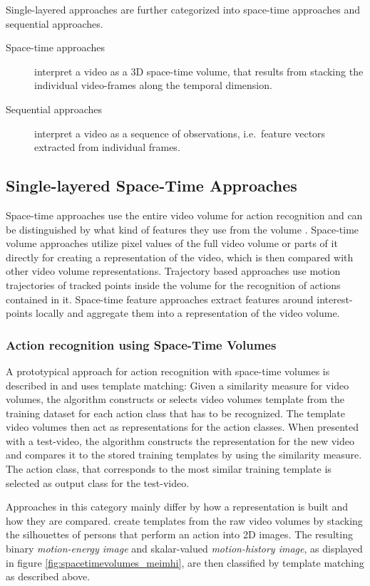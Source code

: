 Single-layered approaches are further categorized into space-time approaches and sequential approaches.
\begin{description}
    \item[Space-time approaches] interpret a video as a 3D space-time volume, that results from stacking the individual video-frames along the temporal dimension.
    \item[Sequential approaches] interpret a video as a sequence of observations, i.e.\ feature vectors extracted from individual frames.
\end{description}


\subsection{Single-layered Space-Time Approaches}
Space-time approaches use the entire video volume for action recognition and can be distinguished by what kind of features they use from the volume \cite{aggarwal_human_2011}.
Space-time volume approaches utilize pixel values of the full video volume or parts of it directly for creating a representation of the video, which is then compared with other video volume representations.
Trajectory based approaches use motion trajectories of tracked points inside the volume for the recognition of actions contained in it.
Space-time feature approaches extract features around interest-points locally and aggregate them into a representation of the video volume.


\subsubsection{Action recognition using Space-Time Volumes}
A prototypical approach for action recognition with space-time volumes is described in \cite{aggarwal_human_2011} and uses template matching:
Given a similarity measure for video volumes, the algorithm constructs or selects video volumes template from the training dataset for each action class that has to be recognized.
The template video volumes then act as representations for the action classes.
When presented with a test-video, the algorithm constructs the representation for the new video and compares it to the stored training templates by using the similarity measure.
The action class, that corresponds to the most similar training template is selected as output class for the test-video.

Approaches in this category mainly differ by how a representation is built and how they are compared.
\textcite{bobick_recognition_2001} create templates from the raw video volumes by stacking the silhouettes of persons that perform an action into 2D images.
The resulting binary \textit{motion-energy image} and skalar-valued \textit{motion-history image}, as displayed in figure \ref{fig:spacetimevolumes_meimhi}, are then classified by template matching as described above.

